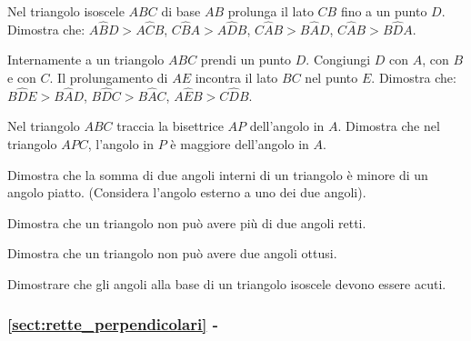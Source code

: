 \begin{esercizio}
\label{ese:3.3}
Nel triangolo isoscele $ABC$ di base $AB$ prolunga il lato $CB$ fino 
a un punto $D$. Dimostra che: $A\widehat{B}D>A\widehat{C}B$, 
$C\widehat{B}A>A\widehat{D}B$, $C\widehat{A}B>B\widehat{A}D$, 
$C\widehat{A}B>B\widehat{D}A$.
\end{esercizio}

\begin{esercizio}
\label{ese:3.4}
Internamente a un triangolo $ABC$ prendi un punto $D$. Congiungi $D$ 
con $A$, con $B$ e con $C$. Il prolungamento di $AE$ incontra il lato 
$BC$ nel punto $E$. Dimostra che: $B\widehat{D}E>B\widehat{A}D$, 
$B\widehat{D}C>B\widehat{A}C$, $A\widehat{E}B>C\widehat{D}B$.
\end{esercizio}

\begin{esercizio}
\label{ese:3.5}
Nel triangolo $ABC$ traccia la bisettrice $AP$ dell'angolo in $A$. 
Dimostra che nel triangolo $APC$, l'angolo in $P$ è maggiore 
dell'angolo in $A$.
\end{esercizio}

\begin{esercizio}
\label{ese:3.6}
Dimostra che la somma di due angoli interni di un triangolo è minore 
di un angolo piatto. (Considera l'angolo esterno a uno dei due 
angoli).
\end{esercizio}

\begin{esercizio}
\label{ese:3.7}
Dimostra che un triangolo non può avere più di due angoli retti.
\end{esercizio}

\begin{esercizio}
\label{ese:3.8}
Dimostra che un triangolo non può avere due angoli ottusi.
\end{esercizio}

\begin{esercizio}
\label{ese:3.9}
Dimostrare che gli angoli alla base di un triangolo isoscele devono 
essere acuti.
\end{esercizio}

\begingroup
\hypersetup{linkcolor=black}
\subsubsection*{\ref{sect:rette_perpendicolari} - 
}
\endgroup

